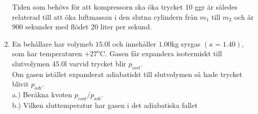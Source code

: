\documentclass[./exercises.tex]{subfiles}
\begin{document}
\begin{enumerate}
Tiden som behövs för att kompressorn ska öka trycket 10 ggr
är således relaterad till att öka luftmassan i den slutna
cylindern från $m_1$ till $m_2$ och är 900 sekunder med
flödet 20 liter per sekund.\\


\vfill\null
\clearpage
\columnbreak
\newpage

\item En behållare har volymeb $15.0$l och innehåller $1.00$kg syrgas $(\kappa = 1.40)$,
som har temperaturen $+27^o$C. Gasen får expandera isotermiskt till slutvolymen
$45.0$l varvid trycket blir $p_{iost}$.\\
Om gasen istället expanderat adiabatiskt till slutvolymen så hade trycket blivit $p_{adi}$.\\
a.) Beräkna kvoten $p_{isot}/p_{adi}$.\\
b.) Vilken sluttemperatur har gasen i det adiabatiska fallet\\


\end{enumerate}
\end{document}
